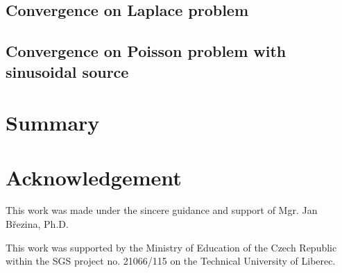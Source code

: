 \documentclass[preprint,12pt]{elsarticle}
\begin{document}
\subsection{Convergence on Laplace problem}
\subsection{Convergence on Poisson problem with sinusoidal source}

\section{Summary}
\label{sec:summary}

\section{Acknowledgement}
This work was made under the sincere guidance and support of Mgr. Jan B{\v r}ezina, Ph.D.

This work was supported by the Ministry of Education of the Czech Republic within the SGS project 
no. 21066/115 on the Technical University of Liberec.





% 
% 
% 
  
 
\end{document}
